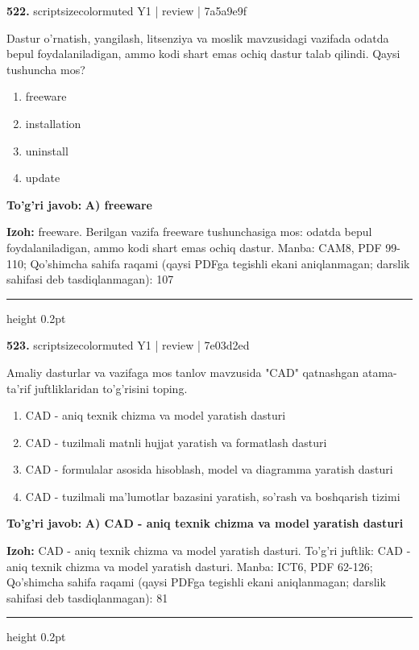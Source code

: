 \documentclass[10pt,a4paper]{article}
\begin{document}
{\bfseries\sffamily\color{ink} 522.} {scriptsizecolor{muted} Y1 | review | 7a5a9e9f}
\par
Dastur o'rnatish, yangilash, litsenziya va moslik mavzusidagi vazifada odatda bepul foydalaniladigan, ammo kodi shart emas ochiq dastur talab qilindi. Qaysi tushuncha mos?
\begin{enumerate}[label=\Alph*),leftmargin=9mm]
\item freeware
\item installation
\item uninstall
\item update
\end{enumerate}
\begin{tcolorbox}[enhanced,breakable,colback=teal!4,colframe=teal!60!black,boxrule=0.45pt,arc=1.2mm,left=2.7mm,right=2.7mm,top=1.8mm,bottom=1.8mm,before skip=2mm,after skip=2mm]
{\bfseries\sffamily\color{teal}To'g'ri javob:} \textbf{A) freeware}
\par\smallskip
{\bfseries Izoh:} freeware. Berilgan vazifa freeware tushunchasiga mos: odatda bepul foydalaniladigan, ammo kodi shart emas ochiq dastur. Manba: CAM8, PDF 99-110; Qo'shimcha sahifa raqami (qaysi PDFga tegishli ekani aniqlanmagan; darslik sahifasi deb tasdiqlanmagan): 107
\end{tcolorbox}
\vspace{2mm}\hrule height 0.2pt\vspace{3mm}

{\bfseries\sffamily\color{ink} 523.} {scriptsizecolor{muted} Y1 | review | 7e03d2ed}
\par
Amaliy dasturlar va vazifaga mos tanlov mavzusida "CAD" qatnashgan atama-ta'rif juftliklaridan to'g'risini toping.
\begin{enumerate}[label=\Alph*),leftmargin=9mm]
\item CAD - aniq texnik chizma va model yaratish dasturi
\item CAD - tuzilmali matnli hujjat yaratish va formatlash dasturi
\item CAD - formulalar asosida hisoblash, model va diagramma yaratish dasturi
\item CAD - tuzilmali ma'lumotlar bazasini yaratish, so'rash va boshqarish tizimi
\end{enumerate}
\begin{tcolorbox}[enhanced,breakable,colback=teal!4,colframe=teal!60!black,boxrule=0.45pt,arc=1.2mm,left=2.7mm,right=2.7mm,top=1.8mm,bottom=1.8mm,before skip=2mm,after skip=2mm]
{\bfseries\sffamily\color{teal}To'g'ri javob:} \textbf{A) CAD - aniq texnik chizma va model yaratish dasturi}
\par\smallskip
{\bfseries Izoh:} CAD - aniq texnik chizma va model yaratish dasturi. To'g'ri juftlik: CAD - aniq texnik chizma va model yaratish dasturi. Manba: ICT6, PDF 62-126; Qo'shimcha sahifa raqami (qaysi PDFga tegishli ekani aniqlanmagan; darslik sahifasi deb tasdiqlanmagan): 81
\end{tcolorbox}
\vspace{2mm}\hrule height 0.2pt\vspace{3mm}
\end{document}
